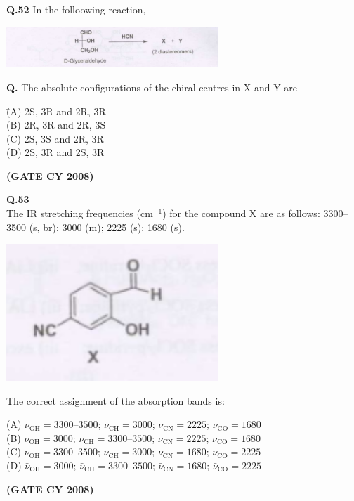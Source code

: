 \documentclass[12pt]{article}
\begin{document}
\begin{enumerate}
\vspace{0.5cm}

\textbf{Q.52} In the folloowing reaction,

\begin{center}
\includegraphics[width=0.6\textwidth]{figs/q52.png}
\end{center}

\textbf{Q.} The absolute configurations of the chiral centres in X and Y are

\begin{tabbing}
\hspace{1cm} \= (A) \quad 2S, 3R \quad and \quad 2R, 3R \\
\> (B) \quad 2R, 3R \quad and \quad 2R, 3S \\
\> (C) \quad 2S, 3S \quad and \quad 2R, 3R \\
\> (D) \quad 2S, 3R \quad and \quad 2S, 3R
\end{tabbing}   \textbf{(GATE CY 2008)}


\textbf{Q.53} \\
The IR stretching frequencies (cm$^{-1}$) for the compound X are as follows: 3300--3500 (s, br); 3000 (m); 2225 (s); 1680 (s). \\

\begin{center}
\includegraphics[width=0.6\textwidth]{figs/q53.png}
\end{center}

The correct assignment of the absorption bands is:

\begin{tabbing}
\hspace{1cm} \= (A) \quad $\bar{\nu}_{\text{OH}} = 3300$--$3500$; $\bar{\nu}_{\text{CH}} = 3000$; $\bar{\nu}_{\text{CN}} = 2225$; $\bar{\nu}_{\text{CO}} = 1680$ \\
\> (B) \quad $\bar{\nu}_{\text{OH}} = 3000$; $\bar{\nu}_{\text{CH}} = 3300$--$3500$; $\bar{\nu}_{\text{CN}} = 2225$; $\bar{\nu}_{\text{CO}} = 1680$ \\
\> (C) \quad $\bar{\nu}_{\text{OH}} = 3300$--$3500$; $\bar{\nu}_{\text{CH}} = 3000$; $\bar{\nu}_{\text{CN}} = 1680$; $\bar{\nu}_{\text{CO}} = 2225$ \\
\> (D) \quad $\bar{\nu}_{\text{OH}} = 3000$; $\bar{\nu}_{\text{CH}} = 3300$--$3500$; $\bar{\nu}_{\text{CN}} = 1680$; $\bar{\nu}_{\text{CO}} = 2225$
\end{tabbing}   \textbf{(GATE CY 2008)}



\end{enumerate}
\end{document}
